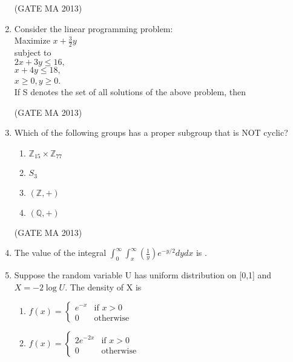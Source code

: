\documentclass[journal,12pt,onecolumn]{IEEEtran}
\theoremstyle{remark}
\begin{document}
\begin{enumerate}
\begin{enumerate}
    \end{enumerate}
    \hfill (GATE MA 2013)
    \item Consider the linear programming problem: \\
    Maximize $x + \frac{3}{2}y$ \\
    subject to \\
    $2x + 3y \le 16,$ \\
    $x + 4y \le 18,$ \\
    $x \ge 0, y \ge 0$. \\
    If S denotes the set of all solutions of the above problem, then
    \begin{enumerate}
    \end{enumerate}
    \hfill (GATE MA 2013)
    \item Which of the following groups has a proper subgroup that is NOT cyclic?
    \begin{enumerate}
        \item $\mathbb{Z}_{15} \times \mathbb{Z}_{77}$
        \item $S_3$
        \item $(\mathbb{Z}, +)$
        \item $(\mathbb{Q}, +)$
    \end{enumerate}
    \hfill (GATE MA 2013)
    \item The value of the integral $\int_{0}^{\infty} \int_{x}^{\infty} \left(\frac{1}{y}\right) e^{-y/2} dy dx$ is \underline{\hspace{1cm}}.
    \item Suppose the random variable U has uniform distribution on [0,1] and $X = -2 \log U$. The density of X is
    \begin{enumerate}
        \item $f(x) = \begin{cases} e^{-x} & \text{if } x>0 \\ 0 & \text{otherwise} \end{cases}$
        \item $f(x) = \begin{cases} 2e^{-2x} & \text{if } x>0 \\ 0 & \text{otherwise} \end{cases}$

\end{enumerate}
\end{enumerate}
\end{document}
